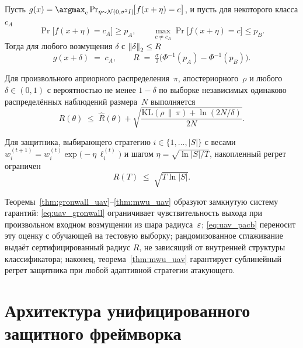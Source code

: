 \begin{theorem}
\label{thm:rs_uav}
Пусть $g(x) = \argmax_{c}\Pr_{\eta\sim\mathcal{N}(0,\sigma^{2}I)}\!
\bigl[f(x+\eta) = c\bigr]$, и пусть для некоторого класса $c_A$
\[
\Pr\!\bigl[f(x+\eta) = c_A\bigr] \ge p_A,\qquad
\max_{c\ne c_A}\Pr\!\bigl[f(x+\eta) = c\bigr] \le p_B.
\]
Тогда для любого возмущения $\delta$ с $\left\lVert\delta\right\rVert_2 \le R$
\[
g(x+\delta) \;=\; c_A,\qquad
R \;=\; \tfrac{\sigma}{2}\!\bigl(\Phi^{-1}(p_A)-\Phi^{-1}(p_B)\bigr).
\]
\end{theorem}

\begin{theorem}\label{thm:pac_uav}
Для произвольного априорного распределения~$\pi$, апостериорного~$\rho$
и любого $\delta\in(0,1)$ с вероятностью не менее $1-\delta$ по
выборке независимых одинаково распределённых наблюдений размера~$N$
выполняется
\begin{equation}
R(\theta) \;\le\; \hat R(\theta) +
\sqrt{\frac{\mathrm{KL}(\rho\,\|\,\pi)+\ln(2N/\delta)}{2N}}.
\label{eq:uav_pacb}
\end{equation}
\end{theorem}

\begin{theorem}\label{thm:mwu_uav}
Для защитника, выбирающего стратегию $i\in\{1,\ldots,|S|\}$ с весами
$w_i^{(t+1)} = w_i^{(t)}\exp\!\bigl(-\eta\,\ell_i^{(t)}\bigr)$ и шагом
$\eta = \sqrt{\ln|S|/T}$, накопленный регрет ограничен
\begin{equation}
R(T) \;\le\; \sqrt{T\ln|S|}.
\label{eq:uav_mwu}
\end{equation}
\end{theorem}

Теоремы~\ref{thm:gronwall_uav}--\ref{thm:mwu_uav} образуют замкнутую
систему гарантий: \eqref{eq:uav_gronwall} ограничивает чувствительность
выхода при произвольном входном возмущении из шара радиуса~$\varepsilon$;
\eqref{eq:uav_pacb} переносит эту оценку с обучающей на тестовую
выборку; рандомизованное сглаживание выдаёт сертифицированный радиус
$R$, не зависящий от внутренней структуры классификатора; наконец,
теорема~\ref{thm:mwu_uav} гарантирует сублинейный регрет защитника при
любой адаптивной стратегии атакующего.

\section{Архитектура унифицированного защитного фреймворка}
\label{sec:uav_arch}

